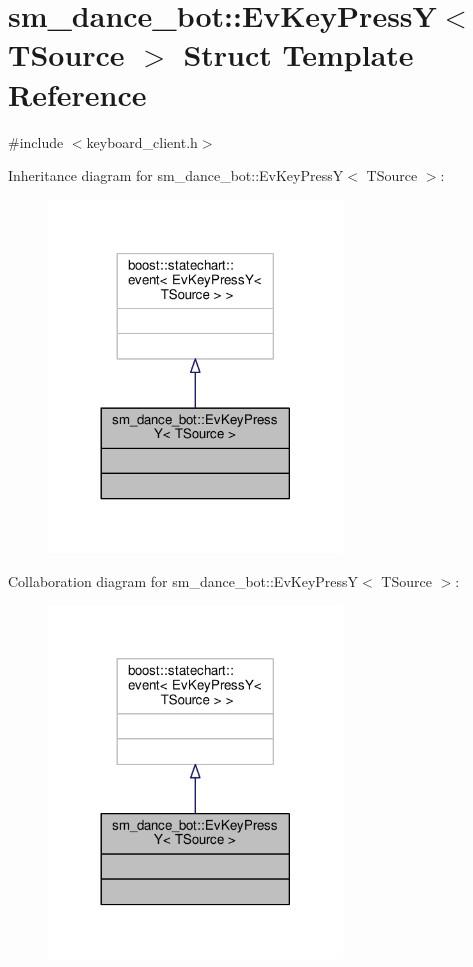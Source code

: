 \hypertarget{structsm__dance__bot_1_1EvKeyPressY}{}\section{sm\+\_\+dance\+\_\+bot\+:\+:Ev\+Key\+PressY$<$ T\+Source $>$ Struct Template Reference}
\label{structsm__dance__bot_1_1EvKeyPressY}


{\ttfamily \#include $<$keyboard\+\_\+client.\+h$>$}



Inheritance diagram for sm\+\_\+dance\+\_\+bot\+:\+:Ev\+Key\+PressY$<$ T\+Source $>$\+:
\nopagebreak
\begin{figure}[H]
\begin{center}
\leavevmode
\includegraphics[width=221pt]{structsm__dance__bot_1_1EvKeyPressY__inherit__graph}
\end{center}
\end{figure}


Collaboration diagram for sm\+\_\+dance\+\_\+bot\+:\+:Ev\+Key\+PressY$<$ T\+Source $>$\+:
\nopagebreak
\begin{figure}[H]
\begin{center}
\leavevmode
\includegraphics[width=221pt]{structsm__dance__bot_1_1EvKeyPressY__coll__graph}
\end{center}
\end{figure}


